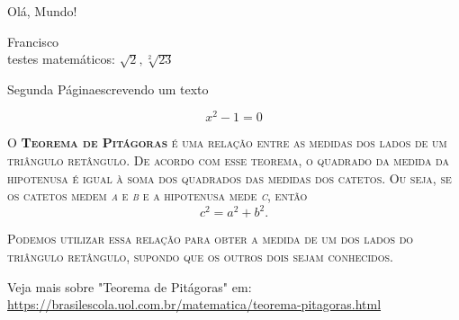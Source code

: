 \documentclass[12pt]{article}
\begin{document}
Olá, Mundo!  

Francisco\\
testes matemáticos: $\sqrt{2}, \sqrt[2]{23}$

\newpage

Segunda Página\hspace{2cm}escrevendo um texto

\begin{equation}
x^2 - 1 = 0
\end{equation}

\noindent\textsc{O \textbf{Teorema de Pitágoras} é uma relação entre as medidas dos lados
de um triângulo retângulo. De acordo com esse teorema, o quadrado da medida
da hipotenusa é igual à soma dos quadrados das medidas dos catetos.
Ou seja, se os catetos medem \textit{a} e \textit{b} e a hipotenusa mede \textit{c}, então}
\begin{equation}
    c^2 = a^2 + b^2.
\end{equation}

\noindent\textsc{Podemos utilizar essa relação para obter a medida de um
dos lados do triângulo retângulo, supondo que os outros dois sejam conhecidos.}

Veja mais sobre "Teorema de Pitágoras" em: \url{https://brasilescola.uol.com.br/matematica/teorema-pitagoras.html}
\end{document}
